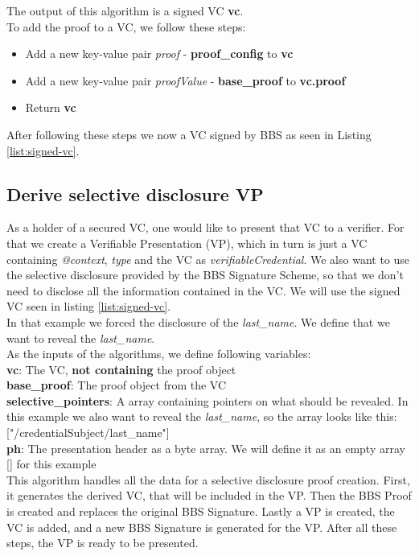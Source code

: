 \documentclass[
	a4paper               %
	,BCOR=0mm            %
	,bibliography=totoc   %
	,listof=totoc         %
	,monolingual
	,twoside=false
]{bfhthesis}              %
\begin{document}
The output of this algorithm is a signed VC \textbf{vc}.\\

To add the proof to a VC, we follow these steps:
\begin{itemize}
	\item Add a new key-value pair \textit{proof} - \textbf{proof\_config} to \textbf{vc}
	\item Add a new key-value pair \textit{proofValue} - \textbf{base\_proof} to \textbf{vc.proof}
	\item Return \textbf{vc}
\end{itemize}

After following these steps we now a VC signed by BBS as seen in Listing \ref{list:signed-vc}.

\subsection{Derive selective disclosure VP}
As a holder of a secured VC, one would like to present that VC to a verifier.
For that we create a Verifiable Presentation (VP), which in turn is just a VC containing \textit{@context}, \textit{type} and the VC as \textit{verifiableCredential}.
We also want to use the selective disclosure provided by the BBS Signature Scheme, so that we don't need to disclose all the information contained in the VC.
We will use the signed VC seen in listing \ref{list:signed-vc}.\\
In that example we forced the disclosure of the \textit{last\_name}.
We define that we want to reveal the \textit{last\_name}.\\

As the inputs of the algorithms, we define following variables:\\
\textbf{vc}: The VC, \textbf{not containing} the proof object\\
\textbf{base\_proof}: The proof object from the VC\\
\textbf{selective\_pointers}: A array containing pointers on what should be revealed. In this example we also want to reveal the \textit{last\_name}, so the array looks like this: ["/credentialSubject/last\_name"]\\
\textbf{ph}: The presentation header as a byte array. We will define it as an empty array [] for this example\\

This algorithm handles all the data for a selective disclosure proof creation.
First, it generates the derived VC, that will be included in the VP.
Then the BBS Proof is created and replaces the original BBS Signature.
Lastly a VP is created, the VC is added, and a new BBS Signature is generated for the VP.
After all these steps, the VP is ready to be presented.\\
\end{document}
